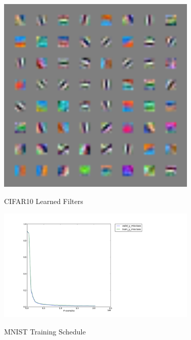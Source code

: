 \documentclass{article}
\begin{document}
\begin{figure}[h!]
    \caption{CIFAR10 Learned Filters}
  \centering
    \includegraphics[width=0.85\textwidth]{figure_4.png}
  \label{fig:f4}
\end{figure}
\begin{figure}[h!]
    \caption{MNIST Training Schedule}
  \centering
    \includegraphics[width=0.85\textwidth]{figure_5.png}
  \label{fig:f5}
\end{figure}
\end{document}

